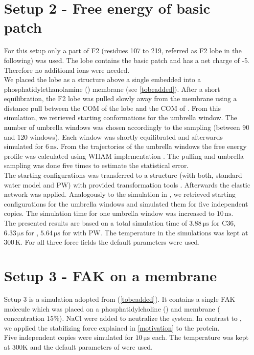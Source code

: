 \section{Setup 2 - Free energy of basic patch}
\label{setup:setup2}
For this setup only a part of F2 (residues 107 to 219, referred as F2 lobe in the following) was used. The lobe contains the basic patch and has a net charge of -5. Therefore no additional ions were needed.\\
We placed the lobe as a \charmm{} structure above a single \pip{} embedded into a phosphatidylethanolamine (\pope{}) membrane (see \autoref{tobeadded}). After a short equilibration, the F2 lobe was pulled slowly away from the membrane using a distance pull between the COM of the lobe and the COM of \pip{}. From this simulation, we retrieved starting conformations for the umbrella window. The number of umbrella windows was chosen accordingly to the sampling (between 90 and 120 windows). Each window was shortly equilibrated and afterwards simulated for $6\,\si{\nano\second}$.  From the trajectories of the umbrella windows the free energy profile was calculated using \gromacs{} WHAM implementation \autocite{gromacsWHAM}. The pulling and umbrella sampling was done five times to estimate the statistical error.\\
The starting configurations was transferred to a \martini{} structure (with both, standard water model and PW) with provided transformation tools \autocite{backward.py}. Afterwards the elastic network was applied. Analogously to the simulation in \charmm{}, we retrieved starting configurations for the umbrella windows and simulated them for five independent copies. The simulation time for one umbrella window was increased to $10\,\si{\nano\second}$.\\
The presented results are based on a total simulation time of $3.88\,\si{\micro\second}$ for C36, $6.33\,\si{\micro\second}$ for \martini{}, $5.64\,\si{\micro\second}$ for \martini{} with PW. The temperature in the simulations was kept at $300\,\si{\kelvin}$. For all three force fields the default parameters were used.
\section{Setup 3 - FAK on a \pip{} membrane}
\label{setup:setup3}
Setup 3 is a \martini{} simulation adopted from \textcite{sara} (\autoref{tobeadded}). It contains a single FAK molecule which was placed on a phosphatidylcholine (\popc{}) and \pip{} membrane (\pip{} concentration $15\%$). NaCl were added to neutralize the system. In contrast to \textcite{sara}, we applied the stabilizing force explained in \autoref{motivation} to the protein.\\
Five independent copies were simulated for $10\,\si{\micro\second}$ each. The temperature was kept at $300\si{\kelvin}$ and the default parameters of \martini{} were used.
